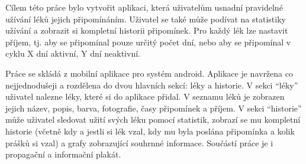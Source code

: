 \documentclass[../TakeYourPill.tex]{subfiles}
\begin{document}
Cílem této práce bylo vytvořit aplikaci, která uživatelům usnadní pravidelné užívání léků jejich připomínáním. Uživatel se také může podívat na statistiky užívání a zobrazit si kompletní historii připomínek. Pro každý lék lze nastavit příjem, tj. aby se připomínal pouze určitý počet dní, nebo aby se připomínal v cyklu X dní aktivní, Y dní neaktivní.

Práce se skládá z mobilní aplikace pro systém android. Aplikace je navržena co nejjednodušeji a rozdělena do dvou hlavních sekcí: léky a historie. V sekci \enquote{léky} uživatel nalezne léky, které si do aplikace přidal. V seznamu léků je zobrazen jejich název, popis, barva, fotografie, časy připomínek a příjem. V sekci \enquote{historie} může uživatel sledovat užití svých léku pomocí statistik, zobrazí se mu kompletní historie (včetně kdy a jestli si lék vzal, kdy mu byla poslána připomínka a kolik prášků si vzal) a grafy zobrazující souhrnné informace. Součástí práce je i propagační a informační plakát.
\end{document}
